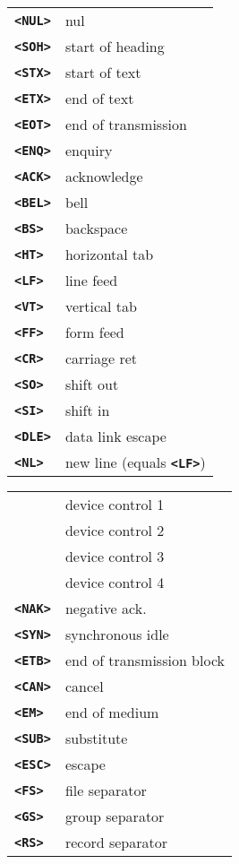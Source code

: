 \documentclass[12pt]{article}
\makeatletter
\newcommand{\TT}[1]{{\tt \bfseries #1}}
\newcommand{\tttkey}[1]{\TT{<#1>}\index{#1@{\tt <#1>}}}
\newlength{\figurewidth}
\newenvironment{boxedfigure}[1][!btp]%
	{\begin{figure*}[#1]
	 \begin{lrbox}{\figurebox}
	 \begin{minipage}{\figurewidth}

	 \vspace*{1ex}}%
	{
	 \vspace*{1ex}

	 \end{minipage}
	 \end{lrbox}
	 \begin{center}
	 \fbox{\hspace*{0.1in}\usebox{\figurebox}\hspace*{0.1in}}
	 \end{center}
	 \end{figure*}}
\makeatother
\begin{document}
\begin{boxedfigure}[!t]

\begin{center}
\begin{tabular}{lp{2in}}
\tttkey{NUL} & nul \\
\tttkey{SOH} & start of heading \\
\tttkey{STX} & start of text \\
\tttkey{ETX} & end of text \\
\tttkey{EOT} & end of transmission \\
\tttkey{ENQ} & enquiry \\
\tttkey{ACK} & acknowledge \\
\tttkey{BEL} & bell \\
\tttkey{BS}  & backspace \\
\tttkey{HT}  & horizontal tab \\
\tttkey{LF}  & line feed \\
\tttkey{VT}  & vertical tab \\
\tttkey{FF}  & form feed \\
\tttkey{CR}  & carriage ret \\
\tttkey{SO}  & shift out \\
\tttkey{SI}  & shift in \\
\tttkey{DLE} & data link escape
\\[1ex]
\tttkey{NL}  & new line (equals \TT{<LF>}) \\
\end{tabular}
\begin{tabular}{lp{2in}}
\tttkey{DC1} & device control 1 \\
\tttkey{DC2} & device control 2 \\
\tttkey{DC3} & device control 3 \\
\tttkey{DC4} & device control 4 \\
\tttkey{NAK} & negative ack. \\
\tttkey{SYN} & synchronous idle \\
\tttkey{ETB} & end of transmission block \\
\tttkey{CAN} & cancel \\
\tttkey{EM}  & end of medium \\
\tttkey{SUB} & substitute \\
\tttkey{ESC} & escape \\
\tttkey{FS}  & file separator \\
\tttkey{GS}  & group separator \\
\tttkey{RS}  & record separator \\

\end{tabular}
\end{center}
\end{boxedfigure}
\end{document}
